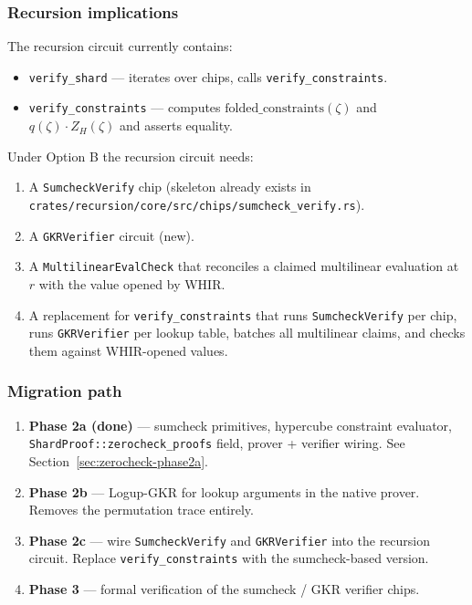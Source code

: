 \subsubsection*{Recursion implications}

The recursion circuit currently contains:
\begin{itemize}
  \item \texttt{verify\_shard} --- iterates over chips, calls
        \texttt{verify\_constraints}.
  \item \texttt{verify\_constraints} --- computes
        $\text{folded\_constraints}(\zeta)$ and
        $q(\zeta) \cdot Z_H(\zeta)$ and asserts equality.
\end{itemize}

Under Option B the recursion circuit needs:
\begin{enumerate}
  \item A \texttt{SumcheckVerify} chip (skeleton already exists in
        \texttt{crates/recursion/core/src/chips/sumcheck\_verify.rs}).
  \item A \texttt{GKRVerifier} circuit (new).
  \item A \texttt{MultilinearEvalCheck} that reconciles a claimed
        multilinear evaluation at $r$ with the value opened by WHIR.
  \item A replacement for \texttt{verify\_constraints} that runs
        \texttt{SumcheckVerify} per chip, runs \texttt{GKRVerifier} per
        lookup table, batches all multilinear claims, and checks them
        against WHIR-opened values.
\end{enumerate}

\subsubsection*{Migration path}

\begin{enumerate}
  \item \textbf{Phase 2a (done)} --- sumcheck primitives, hypercube
        constraint evaluator, \texttt{ShardProof::zerocheck\_proofs} field,
        prover + verifier wiring. See Section~\ref{sec:zerocheck-phase2a}.
  \item \textbf{Phase 2b} --- Logup-GKR for lookup arguments in the native
        prover. Removes the permutation trace entirely.
  \item \textbf{Phase 2c} --- wire \texttt{SumcheckVerify} and
        \texttt{GKRVerifier} into the recursion circuit. Replace
        \texttt{verify\_constraints} with the sumcheck-based version.
  \item \textbf{Phase 3} --- formal verification of the sumcheck / GKR
        verifier chips.
\end{enumerate}

